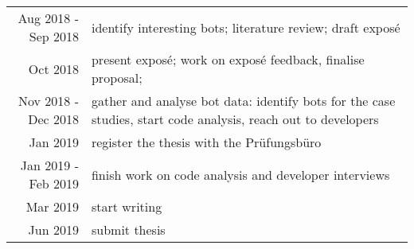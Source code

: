 \documentclass[pdftex,a4paper,11pt]{scrartcl}
\begin{document}
\begin{tabular}{r p{11cm}}
    Aug 2018 - Sep 2018 & identify interesting bots; literature review; draft exposé \\
           Oct 2018 & present exposé; work on exposé feedback, finalise proposal;\\
    Nov 2018 - Dec 2018 & gather and analyse bot data: identify bots for the case studies, start code analysis, reach out to developers \\
           Jan 2019 & register the thesis with the Prüfungsbüro \\
Jan 2019 - Feb 2019 & finish work on code analysis and developer interviews \\
           Mar 2019 & start writing \\
           Jun 2019 & submit thesis \\
\end{tabular}

{}   %


\begin{comment}
\newpage
\section*{Anhang I: Auszug Prüfungsordnung Master}
\label{sec:master}

\begin{figure}[!h]
	\centering
		\texttt{[image: pics/Auszug\_Master\_Pruefungsordnung.pdf]}
	\caption{Auszug Prüfungsordnung Master}
\end{figure}
\end{comment}
\end{document}
